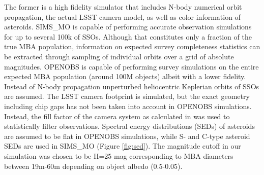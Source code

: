 The former is a high fidelity simulator that includes N-body numerical orbit propagation, the actual \gls{LSST} \gls{camera} model, as well as color information of asteroids. SIMS\_MO is capable of performing accurate observation simulations for up to several 100k of SSOs. Although that constitutes only a fraction of the true MBA population, information on expected survey completeness statistics can be extracted through sampling of individual orbits over a grid of absolute magnitudes. 
OPENOBS is capable of performing survey simulations on the entire expected MBA population (around 100M objects) albeit with a lower fidelity. Instead of N-body propagation unperturbed heliocentric Keplerian orbits of SSOs are assumed. The \gls{LSST} \gls{camera} \gls{footprint} is simulated, but the exact geometry including chip gaps has not been taken into account in OPENOBS simulations. Instead, the fill factor of the \gls{camera} system as calculated in \citet{veres2017high} was used to statistically filter observations. Spectral energy distributions (SEDs) of asteroids are assumed to be flat in OPENOBS simulations, while S- and C-type asteroid \gls{SED}s are used in SIMS\_MO (Figure \ref{fig:sed}). The magnitude cutoff in our simulation was chosen to be H=25 mag corresponding to MBA diameters between 19m-60m depending on object albedo (0.5-0.05).
